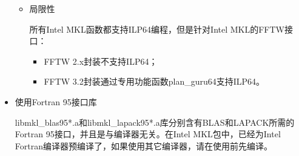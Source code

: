 \documentclass[a4paper,12pt,english]{sphinxmanual}
\begin{document}
\begin{itemize}
\begin{itemize}
\item {} 
\sphinxAtStartPar
局限性

\sphinxAtStartPar
所有Intel MKL函数都支持ILP64编程，但是针对Intel MKL的FFTW接口：
\begin{itemize}
\item {} 
\sphinxAtStartPar
FFTW 2.x封装不支持ILP64；

\item {} 
\sphinxAtStartPar
FFTW 3.2封装通过专用功能函数plan\_guru64支持ILP64。

\end{itemize}

\end{itemize}

\item {} 
\sphinxAtStartPar
使用Fortran 95接口库

\sphinxAtStartPar
libmkl\_blas95*.a和libmkl\_lapack95*.a库分别含有BLAS和LAPACK所需的Fortran 95接口，并且是与编译器无关。在Intel MKL包中，已经为Intel Fortran编译器预编译了，如果使用其它编译器，请在使用前先编译。

\end{itemize}
\end{document}
